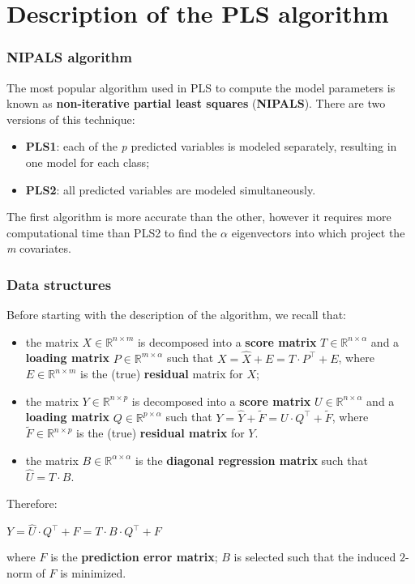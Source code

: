 \section{Description of the PLS  algorithm}

\begin{frame}[fragile]
	\frametitle{NIPALS algorithm}
	The most popular algorithm used in PLS to compute the model parameters is known as \textbf{non-iterative partial least squares} (\textbf{NIPALS}). There are two versions of this technique:
	\begin{itemize}
		\item \textbf{PLS1}: each of the \textit{p} predicted variables is modeled separately, resulting in one model for each class;
		\item \textbf{PLS2}: all predicted variables are modeled simultaneously.
	\end{itemize}
	The first algorithm is more accurate than the other, however it requires more computational time than PLS2 to find the $\alpha$ eigenvectors into which project the \textit{m} covariates. 
\end{frame}

\begin{frame}
	\frametitle{Data structures}
	Before starting with the description of the algorithm, we recall that:
	\begin{itemize}
		\item the matrix $X \in \mathbb{R}^{n\times m}$ is decomposed into a \textbf{score matrix} $T \in \mathbb{R}^{n\times\alpha}$ and a \textbf{loading matrix} $P \in \mathbb{R}^{m\times\alpha}$ such that $X = \hat{X} + E = T\cdot P^\top + E$, where $E \in \mathbb{R}^{n\times m}$ is the (true) \textbf{residual} matrix for $X$;
		\item the matrix $Y \in \mathbb{R}^{n\times p}$ is decomposed into a \textbf{score matrix} $U\in\mathbb{R}^{n\times\alpha}$ and a \textbf{loading matrix} $Q\in \mathbb{R}^{p\times\alpha}$ such that $Y = \hat{Y} + \widetilde{F} = U\cdot Q^\top + \widetilde{F}$, where $\widetilde{F}\in \mathbb{R}^{n\times p}$ is the (true) \textbf{residual matrix} for $Y$.
		\item the matrix $B\in \mathbb{R}^{\alpha\times\alpha}$ is the \textbf{diagonal regression matrix} such that $\hat{U} = T\cdot B$.
	\end{itemize}
	Therefore:
	\begin{center}
		$Y = \hat{U}\cdot Q^\top + F =  T\cdot B\cdot Q^\top + F$
	\end{center}
	where $F$ is the \textbf{prediction error matrix}; $B$ is selected such that the induced $2$-norm of $F$ is minimized. 
\end{frame}

